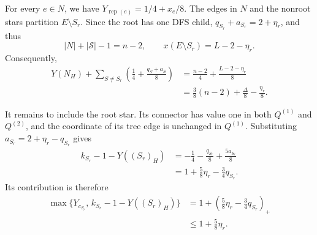 \documentclass[11pt]{amsart}
\newcommand{\rep}[1]{\operatorname{rep}(#1)}
\newcommand{\1}{\mathbbm{1}}
\begin{document}
For every $e\in N$, we have $Y_{\rep{e}}=1/4+x_e/8$.
The edges in $N$ and the nonroot stars partition
$E\setminus S_r$. Since the root has one DFS child,
$q_{S_r}+a_{S_r}=2+\eta_r$, and thus
\[
 |N|+|\mathcal S|-1=n-2,
 \qquad
 x(E\setminus S_r)=L-2-\eta_r.
\]
Consequently,
\[
 \begin{aligned}
 Y(N_H)+\sum_{S\ne S_r}\left(\frac14+\frac{q_S+a_S}{8}\right)
 &=\frac{n-2}{4}+\frac{L-2-\eta_r}{8}\\
 &=\frac38(n-2)+\frac{\Delta}{8}-\frac{\eta_r}{8}.
 \end{aligned}
\]

It remains to include the root star. Its connector has value one
in both ${Q^{(1)}}$ and ${Q^{(2)}}$, and the coordinate of its tree edge is unchanged
in ${Q^{(1)}}$. Substituting $a_{S_r}=2+\eta_r-q_{S_r}$ gives
\[
 \begin{aligned}
 k_{S_r}-1-Y((S_r)_H)
 &=-\frac14-\frac{q_{S_r}}8+\frac{5a_{S_r}}8\\
 &=1+\frac58\eta_r-\frac34q_{S_r}.
 \end{aligned}
\]
Its contribution is therefore
\[
 \begin{aligned}
 \max\{Y_{c_{S_r}},\,k_{S_r}-1-Y((S_r)_H)\}
 &=1+\left(\frac58\eta_r-\frac34q_{S_r}\right)_+\\
 &\le1+\frac58\eta_r.
 \end{aligned}
\]
\end{document}
